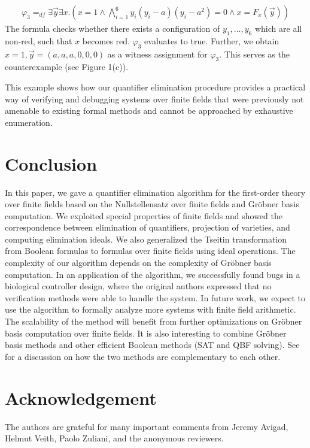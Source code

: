 \documentclass[envcountsect]{llncs}
\begin{document}
{{{\footnotesize 
\begin{eqnarray}\varphi_3 =_{df} \exists \vec y\exists x.(x=1\wedge \bigwedge_{i=1}^{6} y_i(y_i-a)(y_i-a^2)=0\wedge x=F_x(\vec y))
\end{eqnarray}
}The formula checks whether there exists a configuration of $y_1,...,y_6$ which are all non-red, such that $x$ becomes red. $\varphi_3$ evaluates to true. Further, we obtain $x=1,\vec y = (a,a,a,0,0,0)$ as a witness assignment for $\varphi_3$. This serves as the counterexample (see Figure 1(c)). 

This example shows how our quantifier elimination procedure provides a practical way of verifying and debugging systems over finite fields that were previously not amenable to existing formal methods and cannot be approached by exhaustive enumeration.

\section{Conclusion}
In this paper, we gave a quantifier elimination algorithm for the first-order theory over finite fields based on the Nullstellensatz over finite fields and Gr\"obner basis computation. We exploited special properties of finite fields and showed the correspondence between elimination of quantifiers, projection of varieties, and computing elimination ideals. We also generalized the Tseitin transformation from Boolean formulas to formulas over finite fields using ideal operations. The complexity of our algorithm depends on the complexity of Gr\"obner basis computation. In an application of the algorithm, we successfully found bugs in a biological controller design, where the original authors expressed that no verification methods were able to handle the system. In future work, we expect to use the algorithm to formally analyze more systems with finite field arithmetic. The scalability of the method will benefit from further optimizations on Gr\"obner basis computation over finite fields. It is also interesting to combine Gr\"obner basis methods and other efficient Boolean methods (SAT and QBF solving). See \cite{gao09} for a discussion on how the two methods are complementary to each other.

\section*{Acknowledgement}

The authors are grateful for many important comments from Jeremy Avigad, Helmut Veith, Paolo Zuliani, and the anonymous reviewers. 

}}
\end{document}

